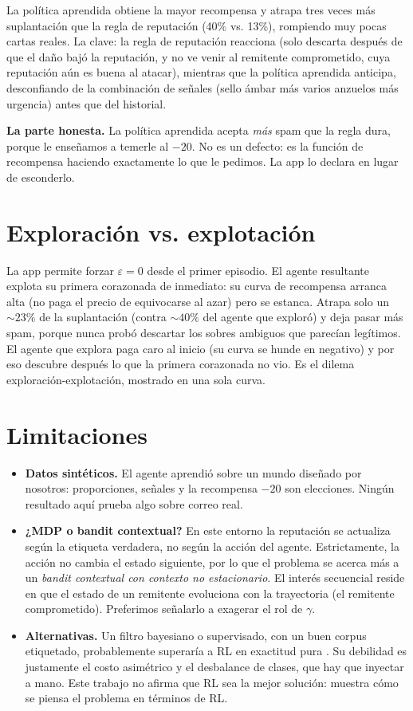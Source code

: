 \documentclass[11pt]{article}
\begin{document}
La política aprendida obtiene la mayor recompensa y atrapa tres veces más
suplantación que la regla de reputación (40\% vs. 13\%), rompiendo muy pocas
cartas reales. La clave: la regla de reputación reacciona (solo descarta
después de que el daño bajó la reputación, y no ve venir al remitente
comprometido, cuya reputación aún es buena al atacar), mientras que la
política aprendida anticipa, desconfiando de la combinación de señales
(sello ámbar más varios anzuelos más urgencia) antes que del historial.

\textbf{La parte honesta.} La política aprendida acepta \textit{más} spam
que la regla dura, porque le enseñamos a temerle al $-20$. No es un defecto:
es la función de recompensa haciendo exactamente lo que le pedimos. La app
lo declara en lugar de esconderlo.

\section{Exploración vs. explotación}

La app permite forzar $\varepsilon = 0$ desde el primer episodio. El agente
resultante explota su primera corazonada de inmediato: su curva de
recompensa arranca alta (no paga el precio de equivocarse al azar) pero se
estanca. Atrapa solo un ${\sim}23\%$ de la suplantación (contra ${\sim}40\%$
del agente que exploró) y deja pasar más spam, porque nunca probó descartar
los sobres ambiguos que parecían legítimos. El agente que explora paga caro
al inicio (su curva se hunde en negativo) y por eso descubre después lo que
la primera corazonada no vio. Es el dilema exploración-explotación, mostrado
en una sola curva.

\section{Limitaciones}

\begin{itemize}[leftmargin=1.4em]
  \item \textbf{Datos sintéticos.} El agente aprendió sobre un mundo
    diseñado por nosotros: proporciones, señales y la recompensa $-20$ son
    elecciones. Ningún resultado aquí prueba algo sobre correo real.
  \item \textbf{¿MDP o bandit contextual?} En este entorno la reputación se
    actualiza según la etiqueta verdadera, no según la acción del agente.
    Estrictamente, la acción no cambia el estado siguiente, por lo que el
    problema se acerca más a un \textit{bandit contextual con contexto no
    estacionario}. El interés secuencial reside en que el estado de un
    remitente evoluciona con la trayectoria (el remitente comprometido).
    Preferimos señalarlo a exagerar el rol de $\gamma$.
  \item \textbf{Alternativas.} Un filtro bayesiano o supervisado, con un
    buen corpus etiquetado, probablemente superaría a RL en exactitud pura
    \cite{sahami1998,cormack2008,pang2021}. Su debilidad es justamente el
    costo asimétrico y el desbalance de clases, que hay que inyectar a
    mano. Este trabajo no afirma que RL sea la mejor solución: muestra cómo
    se piensa el problema en términos de RL.
\end{itemize}
\end{document}
